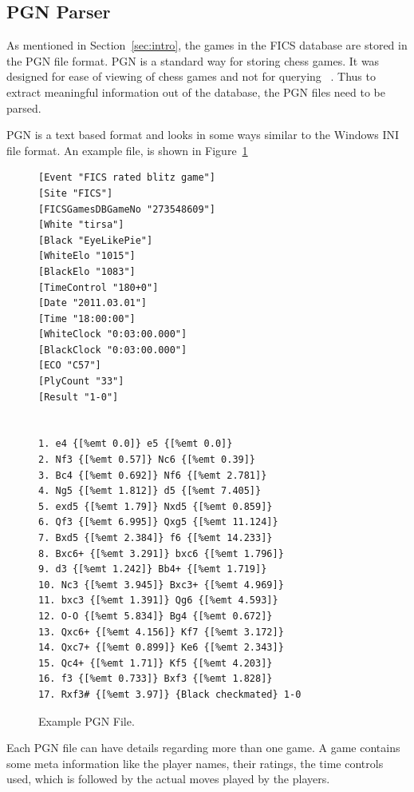 \documentclass{article}
\begin{document}
\subsection{PGN Parser}

As mentioned in Section~\ref{sec:intro}, the games in the FICS
database are stored in the PGN file format. PGN is a standard way for
storing chess games. It was designed for ease of viewing of chess
games and not for querying ~\cite{spec:pgn}. Thus to extract meaningful information out of the database, the PGN files need to be parsed.

PGN is a text based format and looks in some ways similar to the Windows INI file format. An example file, is shown in Figure~\ref{fig:pgn}

\begin{figure}[htp]
\begin{center}
\begin{verbatim}
[Event "FICS rated blitz game"]
[Site "FICS"]
[FICSGamesDBGameNo "273548609"]
[White "tirsa"]
[Black "EyeLikePie"]
[WhiteElo "1015"]
[BlackElo "1083"]
[TimeControl "180+0"]
[Date "2011.03.01"]
[Time "18:00:00"]
[WhiteClock "0:03:00.000"]
[BlackClock "0:03:00.000"]
[ECO "C57"]
[PlyCount "33"]
[Result "1-0"]


1. e4 {[%emt 0.0]} e5 {[%emt 0.0]} 
2. Nf3 {[%emt 0.57]} Nc6 {[%emt 0.39]} 
3. Bc4 {[%emt 0.692]} Nf6 {[%emt 2.781]} 
4. Ng5 {[%emt 1.812]} d5 {[%emt 7.405]} 
5. exd5 {[%emt 1.79]} Nxd5 {[%emt 0.859]} 
6. Qf3 {[%emt 6.995]} Qxg5 {[%emt 11.124]} 
7. Bxd5 {[%emt 2.384]} f6 {[%emt 14.233]} 
8. Bxc6+ {[%emt 3.291]} bxc6 {[%emt 1.796]} 
9. d3 {[%emt 1.242]} Bb4+ {[%emt 1.719]} 
10. Nc3 {[%emt 3.945]} Bxc3+ {[%emt 4.969]} 
11. bxc3 {[%emt 1.391]} Qg6 {[%emt 4.593]} 
12. O-O {[%emt 5.834]} Bg4 {[%emt 0.672]} 
13. Qxc6+ {[%emt 4.156]} Kf7 {[%emt 3.172]} 
14. Qxc7+ {[%emt 0.899]} Ke6 {[%emt 2.343]} 
15. Qc4+ {[%emt 1.71]} Kf5 {[%emt 4.203]} 
16. f3 {[%emt 0.733]} Bxf3 {[%emt 1.828]} 
17. Rxf3# {[%emt 3.97]} {Black checkmated} 1-0

\end{verbatim}
\end{center}

\caption{Example PGN File.}
\label{fig:pgn}
\end{figure}

Each PGN file can have details regarding more than one game. A game contains some meta information like the player names, their ratings, the time controls used, which is followed by the actual moves played by the players.\\
\end{document}
